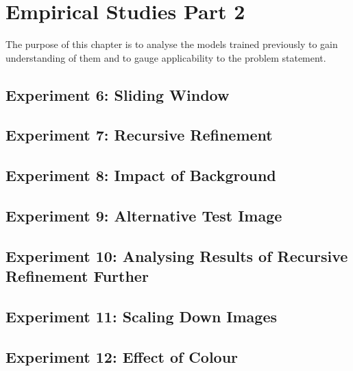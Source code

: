 \chapter{Empirical Studies Part 2}
The purpose of this chapter is to analyse the models trained previously to gain understanding of them and to gauge applicability to the problem statement.

\section{Experiment 6: Sliding Window}
\label{slidingWindow}


\section{Experiment 7: Recursive Refinement}
\label{RR}


\section{Experiment 8: Impact of Background}
\label{background}


\section{Experiment 9: Alternative Test Image}
\label{alternative}


\section{Experiment 10: Analysing Results of Recursive Refinement Further}
\label{rrAnalyse}


\section{Experiment 11: Scaling Down Images}
\label{scale}


\section{Experiment 12: Effect of Colour}
\label{colour}



